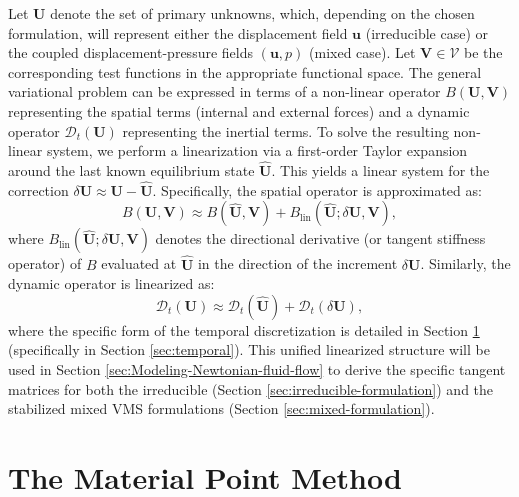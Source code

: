 \documentclass[11pt,english]{article}
\def\TestFunctions{\boldsymbol{V}}
\def\UnkVariables{\boldsymbol{U}}
\def\DerBgenericLIN{B_{\text{lin}}}
\begin{document}
    Let $\UnkVariables$ denote the set of primary unknowns, which, depending on the chosen formulation, will represent either the displacement field $\boldsymbol{u}$ (irreducible case) or the coupled displacement-pressure fields $(\boldsymbol{u}, p)$ (mixed case). Let $\TestFunctions \in \mathcal{V}$ be the corresponding test functions in the appropriate functional space. The general variational problem can be expressed in terms of a non-linear operator $B(\UnkVariables,\TestFunctions)$ representing the spatial terms (internal and external forces) and a dynamic operator $\mathcal{D}_t(\UnkVariables)$ representing the inertial terms. To solve the resulting non-linear system, we perform a linearization via a first-order Taylor expansion around the last known equilibrium state $\hat{\UnkVariables}$. This yields a linear system for the correction $\delta \UnkVariables \approx \UnkVariables - \hat{\UnkVariables}$. Specifically, the spatial operator is approximated as:
    \begin{equation}
        B(\UnkVariables,\TestFunctions) \approx B(\hat{\UnkVariables},\TestFunctions) + \DerBgenericLIN(\hat{\UnkVariables};\delta \UnkVariables, \TestFunctions),
    \end{equation}
    where $\DerBgenericLIN(\hat{\UnkVariables};\delta \UnkVariables, \TestFunctions)$ denotes the directional derivative (or tangent stiffness operator) of $B$ evaluated at $\hat{\UnkVariables}$ in the direction of the increment $\delta \UnkVariables$. Similarly, the dynamic operator is linearized as:
    \begin{equation}
        \mathcal{D}_t(\UnkVariables) \approx \mathcal{D}_t(\hat{\UnkVariables}) + \mathcal{D}_t(\delta \UnkVariables),
    \end{equation}
    where the specific form of the temporal discretization is detailed in Section \ref{sec:Material-Point-Method} (specifically in Section \ref{sec:temporal}). This unified linearized structure will be used in Section \ref{sec:Modeling-Newtonian-fluid-flow} to derive the specific tangent matrices for both the irreducible (Section \ref{sec:irreducible-formulation}) and the stabilized mixed VMS formulations (Section \ref{sec:mixed-formulation}).


%
%
\section{The Material Point Method} \label{sec:Material-Point-Method}
\end{document}
